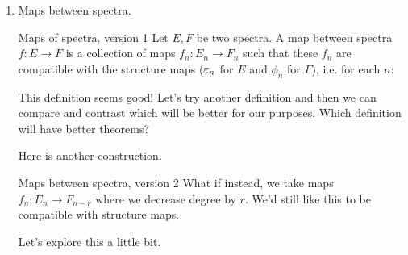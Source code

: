 \begin{enumerate}
    \begin{definition}{Homotopy groups of a spectrum}{}
        Let $E$ be a spectrum. The $r$th homotopy group of $E$ is defined to be:
        $$\pi_r E:=\underset{n\to\infty}{\colim}~\pi_{n+r}E_n.$$
    \end{definition}
    If we take $E = \Sigma^\infty X$, then $\pi_n E = \pi_n^{st} X$, the stable homotopy groups of $X$. This definition recovers the definition of stable homotopy groups! Great!
    \item Maps between spectra. 
    
    \begin{definition}{Maps of spectra, version 1}{}
        Let $E, F$ be two spectra. A {map between spectra} $f:E\to F$ is a collection of maps $f_n:E_n\to F_n$ such that these $f_n$ are compatible with the structure maps ($\varepsilon_n$ for $E$ and $\phi_n$ for $F$), i.e. for each $n$: 
        \begin{center}
        \end{center}
    \end{definition}
    This definition seems good! Let's try another definition and then we can compare and contrast which will be better for our purposes. Which definition will have better theorems?

    Here is another construction. 
    \begin{definition}{Maps between spectra, version 2}{}
        What if instead, we take maps $f_n:E_n\to F_{n-r}$ where we decrease degree by $r$. We'd still like this to be compatible with structure maps. 
        \begin{center}
          \end{center}
    \end{definition}
    Let's explore this a little bit. 


\end{enumerate}
